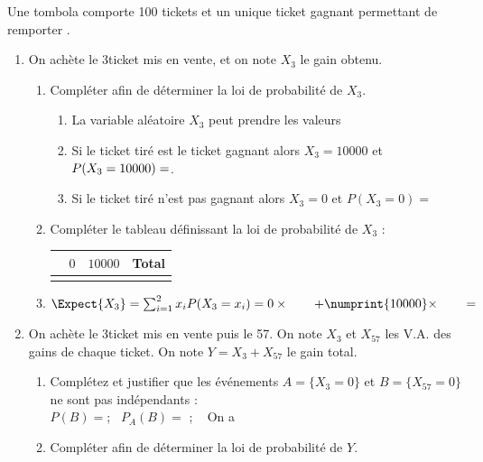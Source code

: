 \documentclass[main.tex]{subfiles}
\begin{document}
\begin{exercise}
	Une tombola comporte 100 tickets et un unique ticket gagnant permettant de remporter .
	

\begin{spacing}{2} 
\begin{enumerate}[leftmargin=*,label=\arabic*)]
		\item On achète le 3\ieme ticket mis en vente, et on note $X_3$ le gain obtenu.
	\begin{enumerate}[leftmargin=*,label=\alph*)]
		\item Compléter afin de déterminer la loi de probabilité de $X_3$. 
		\begin{enumerate}[leftmargin=*,label={}]   
			\item  La variable aléatoire $X_3$ peut prendre les valeurs   \dotfill  
			\item  Si le ticket tiré est le ticket gagnant alors $X_3 =10000$ et $P(X_3 = 10000) = \dotfill $.
			\item Si le ticket tiré n'est pas gagnant alors $X_3=0$ et $P(X_3=0)=$\dotfill 
		\end{enumerate}
		\item Compléter le tableau définissant la loi de probabilité de $X_3$ :\\
		\renewcommand{\arraystretch}{1.0} 
		\null	\hfill \begin{tabularx}{0.7\linewidth}{|c|Y|Y|Y|}
			\hline
			 & $0$ & $10000$  & \textbf{Total} \\ \hline
			 &   &  & \\\hline
		\end{tabularx} 
		\hfill \null\medskip
		\item  $\Expect{X_3}=\sum_{i=1}^2 x_iP(X_3=x_i) = 0\times\qquad +\numprint{10000}\times \qquad  = $\dotfill  
	\end{enumerate}
	\item  On achète le 3\ieme ticket mis en vente puis le 57\ieme. On note $X_3$ et $X_{57}$ les V.A. des gains de chaque ticket. On note $Y=X_3+X_{57}$ le gain total.
	\begin{enumerate}[leftmargin=*,label=\alph*)]
		\item Complétez et justifier que les événements $A=\{X_3=0\}$ et $B=\{X_{57}=0\}$ ne sont pas indépendants :\\
		$P(B)=$\dotfill ; ~$P_A(B)=$ \dotfill ; ~ On a \dotfill\dotfill\dotfill  
		\item Compléter afin de déterminer la loi de probabilité de $Y$. 

\end{enumerate}
\end{enumerate}
\end{spacing}
\end{exercise}
\end{document}
